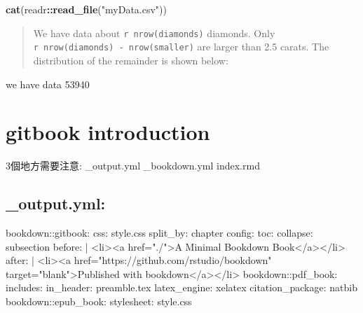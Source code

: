 \documentclass[]{book}
\newenvironment{Shaded}{\begin{snugshade}}{\end{snugshade}}
\newcommand{\AttributeTok}[1]{\textcolor[rgb]{0.77,0.63,0.00}{#1}}
\newcommand{\FunctionTok}[1]{\textcolor[rgb]{0.00,0.00,0.00}{#1}}
\newcommand{\KeywordTok}[1]{\textcolor[rgb]{0.13,0.29,0.53}{\textbf{#1}}}
\newcommand{\NormalTok}[1]{#1}
\newcommand{\OperatorTok}[1]{\textcolor[rgb]{0.81,0.36,0.00}{\textbf{#1}}}
\newcommand{\StringTok}[1]{\textcolor[rgb]{0.31,0.60,0.02}{#1}}
\theoremstyle{definition}
\theoremstyle{definition}
\theoremstyle{definition}
\theoremstyle{remark}
\begin{document}
\begin{Shaded}
\begin{Highlighting}[]
\KeywordTok{cat}\NormalTok{(readr}\OperatorTok{::}\KeywordTok{read_file}\NormalTok{(}\StringTok{"myData.csv"}\NormalTok{))}
\end{Highlighting}
\end{Shaded}

\begin{quote}
We have data about
\texttt{\textasciigrave{}r\ nrow(diamonds)\textasciigrave{}} diamonds.
Only
\texttt{\textasciigrave{}r\ nrow(diamonds)\ -\ nrow(smaller)\textasciigrave{}}
are larger than 2.5 carats. The distribution of the remainder is shown
below:
\end{quote}

we have data 53940

\hypertarget{gitbook-introduction}{%
\chapter{gitbook introduction}\label{gitbook-introduction}}

3個地方需要注意: \_output.yml \_bookdown.yml index.rmd

\hypertarget{output.yml}{%
\section{\_output.yml:}\label{output.yml}}

\begin{Shaded}
\begin{Highlighting}[]
\FunctionTok{bookdown:}\AttributeTok{:gitbook:}
  \FunctionTok{css:}\AttributeTok{ style.css}
  \FunctionTok{split_by:}\AttributeTok{ chapter}
  \FunctionTok{config:}
    \FunctionTok{toc:}
      \FunctionTok{collapse:}\AttributeTok{ subsection}
      \FunctionTok{before:}\AttributeTok{ |}
\NormalTok{        <li><a href=}\StringTok{"./"}\NormalTok{>A Minimal Bookdown Book</a></li>}
      \FunctionTok{after:}\AttributeTok{ |}
        \FunctionTok{<li><a href="https:}\AttributeTok{//github.com/rstudio/bookdown" target="blank">Published with bookdown</a></li>}
\FunctionTok{bookdown:}\AttributeTok{:pdf_book:}
  \FunctionTok{includes:}
    \FunctionTok{in_header:}\AttributeTok{ preamble.tex}
  \FunctionTok{latex_engine:}\AttributeTok{ xelatex}
  \FunctionTok{citation_package:}\AttributeTok{ natbib}
\FunctionTok{bookdown:}\AttributeTok{:epub_book:}
  \FunctionTok{stylesheet:}\AttributeTok{ style.css}
  
\end{Highlighting}
\end{Shaded}
\end{document}
